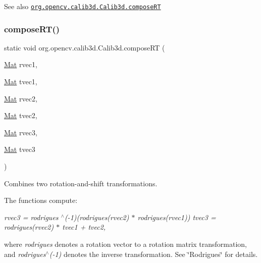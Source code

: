 \begin{DoxySeeAlso}{See also}
\href{http://docs.opencv.org/modules/calib3d/doc/camera_calibration_and_3d_reconstruction.html#composert}{\tt org.\+opencv.\+calib3d.\+Calib3d.\+compose\+RT} 
\end{DoxySeeAlso}
\mbox{\label{classorg_1_1opencv_1_1calib3d_1_1_calib3d_a0549bb2dcba12e0f5c504d6a6871f3a6}} 
\subsubsection{\texorpdfstring{compose\+R\+T()}{composeRT()}\hspace{0.1cm}{\footnotesize\ttfamily [2/2]}}
{\footnotesize\ttfamily static void org.\+opencv.\+calib3d.\+Calib3d.\+compose\+RT (\begin{DoxyParamCaption}\item[{\mbox{\hyperlink{classorg_1_1opencv_1_1core_1_1_mat}{Mat}}}]{rvec1,  }\item[{\mbox{\hyperlink{classorg_1_1opencv_1_1core_1_1_mat}{Mat}}}]{tvec1,  }\item[{\mbox{\hyperlink{classorg_1_1opencv_1_1core_1_1_mat}{Mat}}}]{rvec2,  }\item[{\mbox{\hyperlink{classorg_1_1opencv_1_1core_1_1_mat}{Mat}}}]{tvec2,  }\item[{\mbox{\hyperlink{classorg_1_1opencv_1_1core_1_1_mat}{Mat}}}]{rvec3,  }\item[{\mbox{\hyperlink{classorg_1_1opencv_1_1core_1_1_mat}{Mat}}}]{tvec3 }\end{DoxyParamCaption})\hspace{0.3cm}{\ttfamily [static]}}

Combines two rotation-\/and-\/shift transformations.

The functions compute\+:

{\itshape rvec3 = rodrigues $^\wedge$(-\/1)(rodrigues(rvec2) $\ast$ rodrigues(rvec1)) tvec3 = rodrigues(rvec2) $\ast$ tvec1 + tvec2,}

where {\itshape rodrigues} denotes a rotation vector to a rotation matrix transformation, and {\itshape rodrigues$^\wedge$(-\/1)} denotes the inverse transformation. See \char`\"{}\+Rodrigues\char`\"{} for details.

